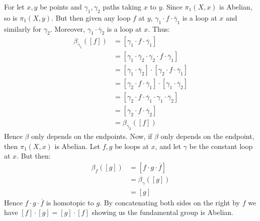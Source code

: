 \documentclass{book}                                                           %
\begin{document}
        \begin{solution}
            For let $x,y$ be points and $\gamma_{1},\gamma_{2}$ paths taking $x$ to
            $y$. Since $\pi_{1}(X,x)$ is Abelian, so is $\pi_{1}(X,y)$. But then
            given any loop $f$ at $y$,
            $\gamma_{1}\cdot{f}\cdot\overline{\gamma}_{1}$ is a loop at $x$ and
            similarly for $\gamma_{2}$. Moreover,
            $\gamma_{1}\cdot\overline{\gamma}_{2}$ is a loop at $x$. Thus:
            \begin{subequations}
                \begin{align}
                    \beta_{\gamma_{1}}([f])
                    &=[\gamma_{1}\cdot{f}\cdot\overline{\gamma}_{1}]\\
                    &=[\gamma_{1}\cdot\overline{\gamma}_{2}
                        \cdot\gamma_{2}\cdot{f}\cdot\overline{\gamma}_{1}]\\
                    &=[\gamma_{1}\cdot\overline{\gamma}_{2}]\cdot
                        [\gamma_{2}\cdot{f}\cdot\overline{\gamma}_{1}]\\
                    &=[\gamma_{2}\cdot{f}\cdot\overline{\gamma}_{1}]\cdot
                        [\gamma_{1}\cdot\overline{\gamma}_{2}]\\
                    &=[\gamma_{2}\cdot{f}\cdot\overline{\gamma}_{1}\cdot
                        \gamma_{1}\cdot\overline{\gamma}_{2}]\\
                    &=[\gamma_{2}\cdot{f}\cdot\overline{\gamma}_{2}]\\
                    &=\beta_{\gamma_{2}}([f])
                \end{align}
            \end{subequations}
            Hence $\beta$ only depends on the endpoints. Now, if $\beta$ only
            depends on the endpoint, then $\pi_{1}(X,x)$ is Abelian. Let
            $f,g$ be loops at $x$, and let $\gamma$ be the constant loop at $x$.
            But then:
            \begin{subequations}
                \begin{align}
                    \beta_{f}([g])&=[f\cdot{g}\cdot\overline{f}]\\
                    &=\beta_{\gamma}([g])\\
                    &=[g]
                \end{align}
            \end{subequations}
            Hence $f\cdot{g}\cdot\overline{f}$ is homotopic to $g$. By concatenating
            both sides on the right by $f$ we have $[f]\cdot[g]=[g]\cdot[f]$ showing
            us the fundamental group is Abelian.
        \end{solution}
\end{document}

